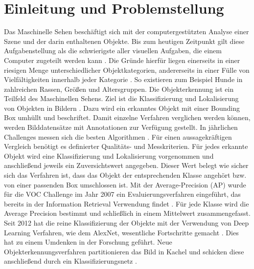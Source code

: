 \chapter{Einleitung und Problemstellung}

Das Maschinelle Sehen besch{\"a}ftigt sich mit der computergest{\"u}tzten Analyse einer Szene und der darin enthaltenen Objekte. 
Bis zum heutigen Zeitpunkt gilt diese Aufgabenstellung als die schwierigste aller visuellen Aufgaben, die einem Computer zugeteilt werden kann \cite[S. 577]{Szeliski2010}.
Die Gr{\"u}nde hierf{\"u}r liegen einerseits in einer riesigen Menge unterschiedlicher Objektkategorien, andererseits in einer F{\"u}lle von Vielf{\"a}ltigkeiten innerhalb jeder Kategorie \cite[S. 577]{Szeliski2010}. 
So existieren zum Beispiel Hunde in zahlreichen Rassen, Gr{\"o}\ss{en} und Altersgruppen. 
\newline
Die Objekterkennung ist ein Teilfeld des Maschinellen Sehens. 
Ziel ist die Klassifizierung und Lokalisierung von Objekten in Bildern \cite[S. 577]{Szeliski2010}. 
Dazu wird ein erkanntes Objekt mit einer Bounding Box umh{\"u}llt und beschriftet. 
Damit einzelne Verfahren verglichen werden k{\"o}nnen, werden Bilddatens{\"a}tze mit Annotationen zur Verf{\"u}gung gestellt. In j{\"a}hrlichen Challenges messen sich die besten Algorithmen \cite{Everingham2010}\cite{Russakovsky2015}. 
F{\"u}r einen aussagekr{\"a}ftigen Vergleich ben{\"o}tigt es definierter Qualit{\"a}ts- und Messkriterien. 
F{\"u}r jedes erkannte Objekt wird eine Klassifizierung und Lokalisierung vorgenommen und anschlie\ss{end} jeweils ein Zuversichtswert angegeben.
Dieser Wert belegt wie sicher sich das Verfahren ist, dass das Objekt der entsprechenden Klasse angeh{\"o}rt bzw. von einer passenden Box umschlossen ist. 
Mit der Average-Precision (AP) wurde f{\"u}r die VOC Challenge im Jahr 2007 ein Evaluierungsverfahren eingef{\"u}hrt, das bereits in der Information Retrieval Verwendung findet \cite{Everingham2010}\cite[S. 160]{Manning2008}. 
F{\"u}r jede Klasse wird die Average Precision bestimmt und schlie\ss{lich} in einem Mittelwert  zusammengefasst. \newline
Seit 2012 hat die reine Klassifizierung der Objekte mit der Verwendung von Deep Learning Verfahren, wie dem AlexNet, wesentliche Fortschritte gemacht \cite{Krizhevsky2012}\cite{He2015}\cite{Szegedy2014}. 
Dies hat zu einem Umdenken in der Forschung gef{\"u}hrt. 
Neue Objekterkennungsverfahren partitionieren das Bild in Kachel und schicken diese anschlie\ss{end} durch ein Klassifizierungsnetz \cite{Sermanet2014}. 
